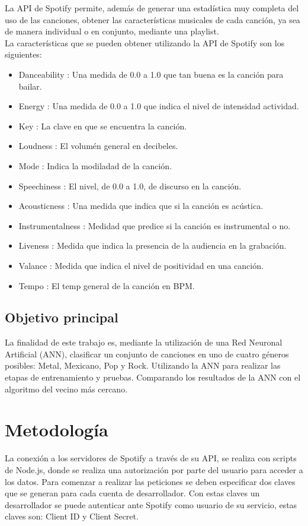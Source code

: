 \documentclass[conference]{IEEEtran}
\begin{document}
La API de Spotify permite, además de generar una estadística muy completa del uso de las canciones, obtener las características musicales de cada canción, ya sea de manera individual o en conjunto, mediante una playlist.\\
La características que se pueden obtener utilizando la API de Spotify son los siguientes: \\

\begin{itemize}
	\item Danceability : Una medida de 0.0 a 1.0 que tan buena es la canción para bailar.
	\item Energy : Una medida de 0.0 a 1.0 que indica el nivel de intensidad actividad.
	\item Key : La clave en que se encuentra la canción.
	\item Loudness : El volumén general en decibeles.
	\item Mode : Indica la modiladad de la canción.
	\item Speechiness : El nivel, de 0.0 a 1.0, de discurso en la canción.
	\item Acousticness : Una medida que indica que si la canción es acústica.
	\item Instrumentalness : Medidad que predice si la canción es instrumental o no.
	\item Liveness : Medida que indica la presencia de la audiencia en la grabación.
	\item Valance : Medida que indica el nivel de positividad en una canción.
	\item Tempo : El temp general de la canción en BPM.  \\
\end{itemize}

\subsection{Objetivo principal}
La finalidad de este trabajo es, mediante la utilización de una Red Neuronal Artificial (ANN), clasificar un conjunto de canciones en uno de cuatro géneros posibles: Metal, Mexicano, Pop y Rock. Utilizando la ANN para realizar las etapas de entrenamiento y pruebas. Comparando los resultados de la ANN con el algoritmo del vecino más cercano.\\

\section{Metodolog\'ia}
La conexión a los servidores de Spotify a través de su API, se realiza con scripts de Node.js, donde se realiza una autorización por parte del usuario para acceder a los datos. Para comenzar a realizar las peticiones se deben especificar dos claves que se generan para cada cuenta de desarrollador. Con estas claves un desarrollador se puede autenticar ante Spotify como usuario de su servicio, estas claves son: Client ID y Client Secret.\\
\end{document}
